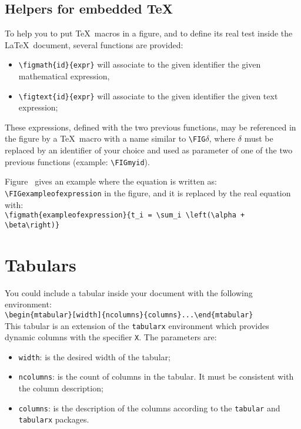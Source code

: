 \documentclass[book]{upmethodology-document}
\begin{document}
\subsection{Helpers for embedded \TeX}

To help you to put \TeX\ macros in a figure, and to define its real test inside the \LaTeX\ document, several functions are provided:
\begin{itemize}
\item \texttt{{\textbackslash}figmath\{id\}\{expr\}} will associate to the given identifier the given mathematical expression,
\item \texttt{{\textbackslash}figtext\{id\}\{expr\}} will associate to the given identifier the given text expression;
\end{itemize}

These expressions, defined with the two previous functions, may be referenced in the figure by a \TeX\ macro with a name similar to \texttt{{\textbackslash}FIG$\delta$}, where $\delta$ must be replaced by an identifier of your choice and used as parameter of one of the two previous functions (example: \texttt{{\textbackslash}FIGmyid}).

Figure~ gives an example where the equation is written as: \texttt{{\textbackslash}FIGexampleofexpression} in the figure, and it is replaced by the real equation with: \\
\texttt{{\textbackslash}figmath\{exampleofexpression\}\{t\_i = {\textbackslash}sum\_i {\textbackslash}left({\textbackslash}alpha + {\textbackslash}beta{\textbackslash}right)\}}



\section{Tabulars}

You could include a tabular inside your document with the following environment: \\
\texttt{{\textbackslash}begin\{mtabular\}[width]\{ncolumns\}\{columns\}...{\textbackslash}end\{mtabular\}} \\

This tabular is an extension of the \texttt{tabularx} environment which provides dynamic columns with the specifier \texttt{X}. The parameters are:
\begin{itemize}
\item \texttt{width}: is the desired width of the tabular;

\item \texttt{ncolumns}: is the count of columns in the tabular. It must be consistent with the column description;

\item \texttt{columns}: is the description of the columns according to the \texttt{tabular} and \texttt{tabularx} packages.

\end{itemize}
\end{document}

